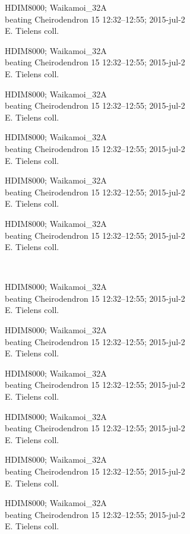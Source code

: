 \documentclass[2pt]{extarticle}
\begin{document}
\noindent
\parbox{0.16\textwidth}{\tiny \raggedright \rule[-0.3\baselineskip]{0pt}{10pt}HDIM8000; Waikamoi\_32A\\ beating Cheirodendron 15 12:32--12:55; 2015-jul-2\\ E. Tielens coll.}
\parbox{0.16\textwidth}{\tiny \raggedright \rule[-0.3\baselineskip]{0pt}{10pt}HDIM8000; Waikamoi\_32A\\ beating Cheirodendron 15 12:32--12:55; 2015-jul-2\\ E. Tielens coll.}
\parbox{0.16\textwidth}{\tiny \raggedright \rule[-0.3\baselineskip]{0pt}{10pt}HDIM8000; Waikamoi\_32A\\ beating Cheirodendron 15 12:32--12:55; 2015-jul-2\\ E. Tielens coll.}
\parbox{0.16\textwidth}{\tiny \raggedright \rule[-0.3\baselineskip]{0pt}{10pt}HDIM8000; Waikamoi\_32A\\ beating Cheirodendron 15 12:32--12:55; 2015-jul-2\\ E. Tielens coll.}
\parbox{0.16\textwidth}{\tiny \raggedright \rule[-0.3\baselineskip]{0pt}{10pt}HDIM8000; Waikamoi\_32A\\ beating Cheirodendron 15 12:32--12:55; 2015-jul-2\\ E. Tielens coll.}
\parbox{0.16\textwidth}{\tiny \raggedright \rule[-0.3\baselineskip]{0pt}{10pt}HDIM8000; Waikamoi\_32A\\ beating Cheirodendron 15 12:32--12:55; 2015-jul-2\\ E. Tielens coll.} \\ 
\vspace{0.001in} 

\noindent
\parbox{0.16\textwidth}{\tiny \raggedright \rule[-0.3\baselineskip]{0pt}{10pt}HDIM8000; Waikamoi\_32A\\ beating Cheirodendron 15 12:32--12:55; 2015-jul-2\\ E. Tielens coll.}
\parbox{0.16\textwidth}{\tiny \raggedright \rule[-0.3\baselineskip]{0pt}{10pt}HDIM8000; Waikamoi\_32A\\ beating Cheirodendron 15 12:32--12:55; 2015-jul-2\\ E. Tielens coll.}
\parbox{0.16\textwidth}{\tiny \raggedright \rule[-0.3\baselineskip]{0pt}{10pt}HDIM8000; Waikamoi\_32A\\ beating Cheirodendron 15 12:32--12:55; 2015-jul-2\\ E. Tielens coll.}
\parbox{0.16\textwidth}{\tiny \raggedright \rule[-0.3\baselineskip]{0pt}{10pt}HDIM8000; Waikamoi\_32A\\ beating Cheirodendron 15 12:32--12:55; 2015-jul-2\\ E. Tielens coll.}
\parbox{0.16\textwidth}{\tiny \raggedright \rule[-0.3\baselineskip]{0pt}{10pt}HDIM8000; Waikamoi\_32A\\ beating Cheirodendron 15 12:32--12:55; 2015-jul-2\\ E. Tielens coll.}
\parbox{0.16\textwidth}{\tiny \raggedright \rule[-0.3\baselineskip]{0pt}{10pt}HDIM8000; Waikamoi\_32A\\ beating Cheirodendron 15 12:32--12:55; 2015-jul-2\\ E. Tielens coll.} \\ 
\vspace{0.001in} 
\end{document}
